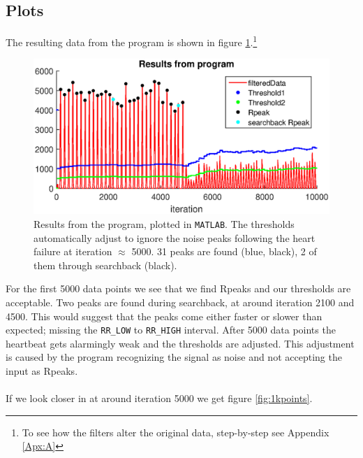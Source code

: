 \subsection{Plots}


The resulting data from the program is shown in figure \ref{fig:10k_points}.\footnote{To see how the filters alter the original data, step-by-step see Appendix \eqref{Apx:A}}

\begin{figure}[H]
    \centering
    \includegraphics[width=1.0\textwidth]{3Results/fig/10kpointsmatlab.eps}
    \caption{Results from the program, plotted in \texttt{MATLAB}. The thresholds automatically adjust to ignore the noise peaks following the heart failure at iteration $\approx$ 5000. 31 peaks are found (blue, black), 2 of them through searchback (black). }
    \label{fig:10k_points}
\end{figure}

For the first 5000 data points we see that we find Rpeaks and our thresholds are acceptable. Two peaks are found during searchback, at around iteration 2100 and 4500. This would suggest that the peaks come either faster or slower than expected; missing the \texttt{RR\_LOW} to \texttt{RR\_HIGH} interval. After 5000 data points the heartbeat gets alarmingly weak and the thresholds are adjusted. This adjustment is caused by the program recognizing the signal as noise and not accepting the input as Rpeaks.\\
\\
If we look closer in at around iteration 5000 we get figure \ref{fig:1kpoints}.

